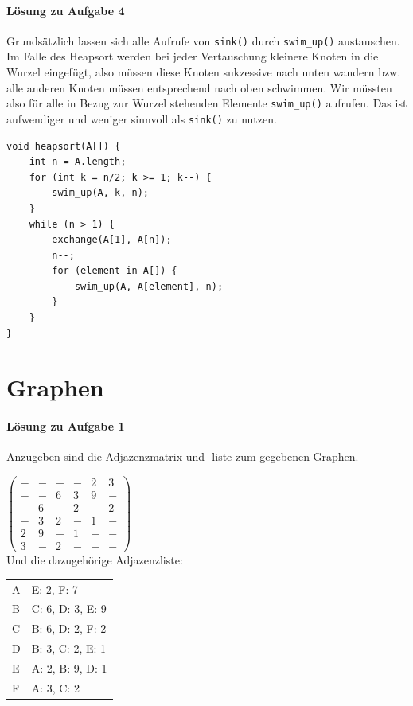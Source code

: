 \documentclass[11pt,a4paper]{scrartcl}
\begin{document}
\paragraph{Lösung zu Aufgabe 4}
\label{a5.4:lsg}
Grundsätzlich lassen sich alle Aufrufe von \texttt{sink()} durch \texttt{swim{\_}up()} austauschen. Im Falle des Heapsort werden bei jeder Vertauschung kleinere Knoten in die Wurzel eingefügt, also müssen diese Knoten sukzessive nach unten wandern bzw. alle anderen Knoten müssen entsprechend nach oben schwimmen. Wir müssten also für alle in Bezug zur Wurzel stehenden Elemente \texttt{swim{\_}up()} aufrufen. Das ist aufwendiger und weniger sinnvoll als \texttt{sink()} zu nutzen.
\begin{lstlisting}
void heapsort(A[]) {
	int n = A.length;
	for (int k = n/2; k >= 1; k--) {
		swim_up(A, k, n);
	}
	while (n > 1) {
		exchange(A[1], A[n]);
		n--;
		for (element in A[]) {
			swim_up(A, A[element], n);
		}	
	}
}
\end{lstlisting}
\section{Graphen}
\paragraph{Lösung zu Aufgabe 1}
\label{a6.1:lsg}
Anzugeben sind die Adjazenzmatrix und -liste zum gegebenen Graphen. \\
\begin{center}
$\left( \begin{array}{rrrrrr}
- & - & - & - & 2 & 3 \\
- & - & 6 & 3 & 9 & - \\
- & 6 & - & 2 & - & 2 \\
- & 3 & 2 & - & 1 & - \\
2 & 9 & - & 1 & - & - \\
3 & - & 2 & - & - & - 
\end{array} \right)$ \\
Und die dazugehörige Adjazenzliste: \\
\begin{tabular}{l | l}
A & E: 2, F: 7 \\
B & C: 6, D: 3, E: 9 \\
C & B: 6, D: 2, F: 2 \\
D & B: 3, C: 2, E: 1 \\
E & A: 2, B: 9, D: 1 \\
F & A: 3, C: 2
\end{tabular}
\end{center}
\end{document}
